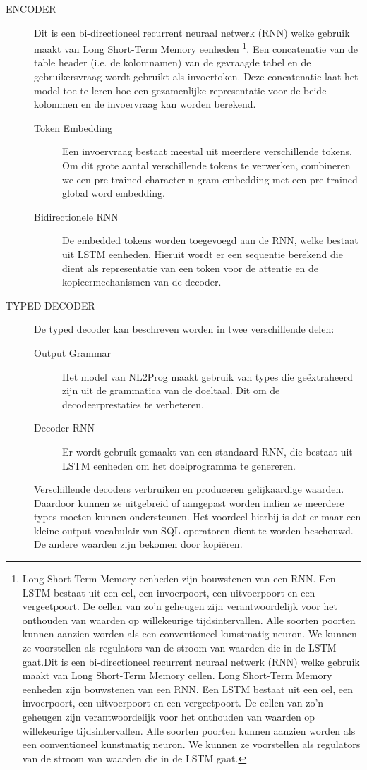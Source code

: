 \begin{description}
	\item[ENCODER] Dit is een bi-directioneel recurrent neuraal netwerk (RNN) welke gebruik maakt van Long Short-Term Memory eenheden \footnote{Long Short-Term Memory eenheden zijn bouwstenen van een RNN. Een LSTM bestaat uit een cel, een invoerpoort, een uitvoerpoort en een vergeetpoort. De cellen van zo’n geheugen zijn verantwoordelijk voor het onthouden van waarden op willekeurige tijdsintervallen. Alle soorten poorten kunnen aanzien worden als een conventioneel kunstmatig neuron. We kunnen ze voorstellen als regulators van de stroom van waarden die in de LSTM gaat.Dit is een bi-directioneel recurrent neuraal netwerk (RNN) welke gebruik maakt van Long Short-Term Memory cellen. Long Short-Term Memory eenheden zijn bouwstenen van een RNN. Een LSTM bestaat uit een cel, een invoerpoort, een uitvoerpoort en een vergeetpoort. De cellen van zo’n geheugen zijn verantwoordelijk voor het onthouden van waarden op willekeurige tijdsintervallen. Alle soorten poorten kunnen aanzien worden als een conventioneel kunstmatig neuron. We kunnen ze voorstellen als regulators van de stroom van waarden die in de LSTM gaat.}. Een concatenatie van de table header (i.e. de kolomnamen) van de gevraagde tabel en de gebruikersvraag wordt gebruikt als invoertoken. Deze concatenatie laat het model toe te leren hoe een gezamenlijke representatie voor de beide kolommen en de invoervraag kan worden berekend.
	\begin{description}
		\item[Token Embedding] Een invoervraag bestaat meestal uit meerdere verschillende tokens. Om dit grote aantal verschillende tokens te verwerken, combineren we een pre-trained character n-gram embedding met een pre-trained global word embedding. 
		\item[Bidirectionele RNN] De embedded tokens worden toegevoegd aan de RNN, welke bestaat uit LSTM eenheden. Hieruit wordt er een sequentie berekend die dient als representatie van een token voor de attentie en de kopieermechanismen van de decoder.
	\end{description}
	\item[TYPED DECODER] De typed decoder kan beschreven worden in twee verschillende delen:
	\begin{description}
		\item[Output Grammar] Het model van NL2Prog maakt gebruik van types die geëxtraheerd zijn uit de grammatica van de doeltaal. Dit om de decodeerprestaties te verbeteren.
		\item[Decoder RNN] Er wordt gebruik gemaakt van een standaard RNN, die bestaat uit LSTM eenheden om het doelprogramma te genereren. 
	\end{description}
	Verschillende decoders verbruiken en produceren gelijkaardige waarden. Daardoor kunnen ze uitgebreid of aangepast worden indien ze meerdere types moeten kunnen ondersteunen. Het voordeel hierbij is dat er maar een kleine output vocabulair van SQL-operatoren dient te worden beschouwd. De andere waarden zijn bekomen door kopiëren.
\end{description}

